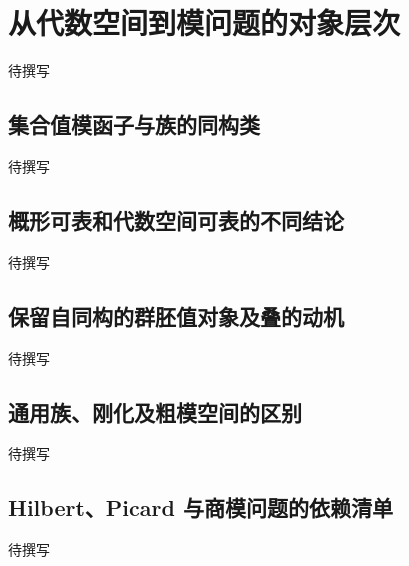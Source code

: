
% 
% 
% 
% 

\section{从代数空间到模问题的对象层次}
\label{g5:sec:1606}

待撰写

\subsection{集合值模函子与族的同构类}
\label{g5:subsec:1606:01}
待撰写

\subsection{概形可表和代数空间可表的不同结论}
\label{g5:subsec:1606:02}
待撰写

\subsection{保留自同构的群胚值对象及叠的动机}
\label{g5:subsec:1606:03}
待撰写

\subsection{通用族、刚化及粗模空间的区别}
\label{g5:subsec:1606:04}
待撰写

\subsection{Hilbert、Picard 与商模问题的依赖清单}
\label{g5:subsec:1606:05}
待撰写
